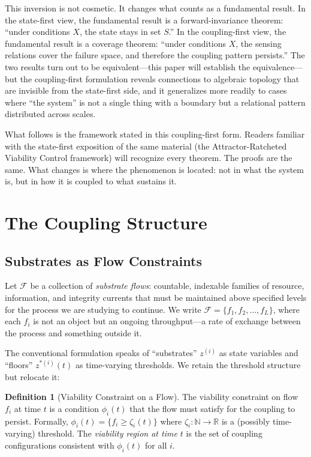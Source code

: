 \documentclass[11pt]{article}
\theoremstyle{definition}
\newtheorem{definition}[theorem]{Definition}
\theoremstyle{remark}
\begin{document}
This inversion is not cosmetic. It changes what counts as a fundamental result. In the state-first view, the fundamental result is a forward-invariance theorem: ``under conditions $X$, the state stays in set $S$.'' In the coupling-first view, the fundamental result is a coverage theorem: ``under conditions $X$, the sensing relations cover the failure space, and therefore the coupling pattern persists.'' The two results turn out to be equivalent---this paper will establish the equivalence---but the coupling-first formulation reveals connections to algebraic topology that are invisible from the state-first side, and it generalizes more readily to cases where ``the system'' is not a single thing with a boundary but a relational pattern distributed across scales.

What follows is the framework stated in this coupling-first form. Readers familiar with the state-first exposition of the same material (the Attractor-Ratcheted Viability Control framework) will recognize every theorem. The proofs are the same. What changes is where the phenomenon is located: not in what the system is, but in how it is coupled to what sustains it.

\section{The Coupling Structure}

\subsection{Substrates as Flow Constraints}

Let $\mathcal{F}$ be a collection of \emph{substrate flows}: countable, indexable families of resource, information, and integrity currents that must be maintained above specified levels for the process we are studying to continue. We write $\mathcal{F} = \{f_1, f_2, \ldots, f_L\}$, where each $f_i$ is not an object but an ongoing throughput---a rate of exchange between the process and something outside it.

The conventional formulation speaks of ``substrates'' $z^{(i)}$ as state variables and ``floors'' $z^{*(i)}(t)$ as time-varying thresholds. We retain the threshold structure but relocate it:

\begin{definition}[Viability Constraint on a Flow]
The viability constraint on flow $f_i$ at time $t$ is a condition $\phi_i(t)$ that the flow must satisfy for the coupling to persist. Formally, $\phi_i(t) = \{f_i \geq \zeta_i(t)\}$ where $\zeta_i: \mathbb{N} \to \mathbb{R}$ is a (possibly time-varying) threshold. The \emph{viability region at time $t$} is the set of coupling configurations consistent with $\phi_i(t)$ for all $i$.
\end{definition}
\end{document}
